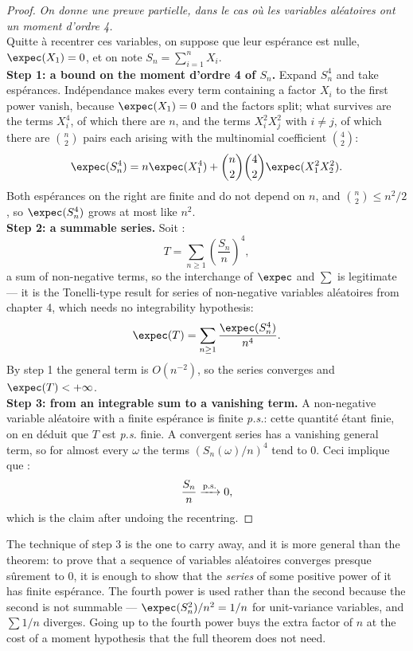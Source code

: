 \begin{proof}
  \textit{On donne une preuve partielle, dans le cas où les variables
  aléatoires ont un moment d'ordre 4.}\\
  Quitte à recentrer ces variables, on suppose que leur espérance est nulle,
  $\expec(X_{1}) = 0$, et on note
  $S_{n} = \sum_{i=1}^{n} X_{i}$.\\
  \textbf{Step 1: a bound on the moment d'ordre 4 of $S_{n}$.} Expand
  $S_{n}^{4}$ and take espérances. Indépendance makes every term containing a
  factor $X_{i}$ to the first power vanish, because $\expec(X_{1}) = 0$ and the
  factors split; what
  survives are the terms $X_{i}^{4}$, of which there are $n$, and the terms
  $X_{i}^{2}X_{j}^{2}$ with $i \neq j$, of which there are $\binom{n}{2}$ pairs
  each arising with the multinomial coefficient $\binom{4}{2}$:
  \[
    \expec(S_{n}^{4}) = n \expec(X_{1}^{4})
      + \binom{n}{2}\binom{4}{2} \expec(X_{1}^{2}X_{2}^{2}) .
  \]
  Both espérances on the right are finite and do not depend on $n$, and
  $\binom{n}{2} \leq n^{2}/2$, so $\expec(S_{n}^{4})$ grows at most like
  $n^{2}$.\\
  \textbf{Step 2: a summable series.} Soit :
  \[
    T = \sum_{n \geq 1} \left(\frac{S_{n}}{n}\right)^{4} ,
  \]
  a sum of non-negative terms, so the interchange of $\expec$ and $\sum$ is
  legitimate --- it is the Tonelli-type result for series of non-negative
  variables aléatoires from chapter 4, which needs no integrability
  hypothesis:
  \[
    \expec(T) = \sum_{n \geq 1} \frac{\expec(S_{n}^{4})}{n^{4}} .
  \]
  By step 1 the general term is $O(n^{-2})$, so the series converges and
  $\expec(T) < +\infty$.\\
  \textbf{Step 3: from an integrable sum to a vanishing term.} A non-negative
  variable aléatoire with a finite espérance is finite \textit{p.s.}: cette
  quantité étant finie, on en déduit que $T$ est \textit{p.s.} finie. A
  convergent series has a vanishing general term, so for almost every $\omega$
  the terms $(S_{n}(\omega)/n)^{4}$ tend to $0$. Ceci implique que :
  \[
    \frac{S_{n}}{n} \xrightarrow{\text{p.s.}} 0 ,
  \]
  which is the claim after undoing the recentring.
\end{proof}

\begin{remark}
  The technique of step 3 is the one to carry away, and it is more general than
  the theorem: to prove that a sequence of variables aléatoires converges
  presque sûrement to $0$, it is enough to show that the \emph{series} of some
  positive power of it has finite espérance. The fourth power is used rather than the
  second because the second is not summable --- $\expec(S_{n}^{2})/n^{2} = 1/n$
  for unit-variance variables, and $\sum 1/n$ diverges. Going up to the fourth
  power buys the extra factor of $n$ at the cost of a moment hypothesis that the
  full theorem does not need.
\end{remark}

